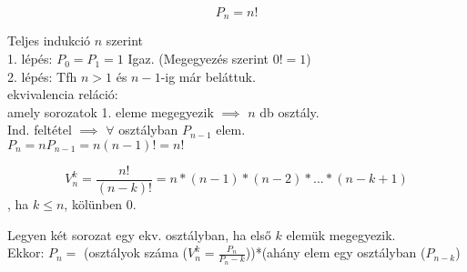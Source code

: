 \begin{frame}
\begin{tcolorbox}[title={Def.: Permutáció}]
\end{tcolorbox}

\begin{tcolorbox}[title={Tétel: Permutációk száma}]
$$P_n = n!$$
\end{tcolorbox}

\begin{tcolorbox}[title={Bizonyítás}]
Teljes indukció $n$ szerint\\
1. lépés: $P_0 = P_1 = 1$ Igaz. (Megegyezés szerint $0! = 1$)\\
2. lépés: Tfh $n > 1$ és $n - 1$-ig már beláttuk.\\
ekvivalencia reláció:\\
amely sorozatok 1. eleme megegyezik $\implies$ $n$ db osztály.\\
Ind. feltétel $\implies$ $\forall$ osztályban $P_{n - 1}$ elem.\\
$P_n = nP_{n - 1} = n(n - 1)! = n!$
\end{tcolorbox}

\begin{tcolorbox}[title={Def.: Ciklikus permutáció}]
\end{tcolorbox}
\end{frame}

\begin{frame}
\begin{tcolorbox}[title={Def.:Ismétlés nélküli variáció}]
\end{tcolorbox}

\begin{tcolorbox}[title={Tétel: Variációk száma}]
$$V_n^k = \frac{n!}{(n - k)!} = n * (n - 1) * (n - 2) * ... * (n - k + 1)$$, ha $k \leq n$, kölünben 0.
\end{tcolorbox}

\begin{tcolorbox}[title={Bizonyítás}]
Legyen két sorozat egy ekv. osztályban, ha első $k$ elemük megegyezik.\\
Ekkor: $P_n = $ (osztályok száma ($V_n^k = \frac{P_n}{P_n - k}$))*(ahány elem egy osztályban ($P_{n - k}$)
\end{tcolorbox}
\end{frame}

